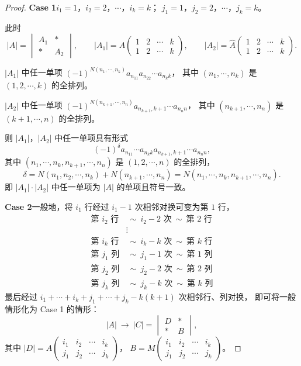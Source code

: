 \begin{proof}
\textbf{Case 1}\quad $i_1=1$，$i_2=2$，$\cdots$，$i_k=k$；\;
$j_1=1$，$j_2=2$，$\cdots$，$j_k=k$。

此时
\[
|A|=\begin{vmatrix}A_1&*\\ *&A_2\end{vmatrix},\qquad
|A_1|=A\begin{pmatrix}1&2&\cdots&k\\1&2&\cdots&k\end{pmatrix},\qquad
|A_2|=\hat{A}\begin{pmatrix}1&2&\cdots&k\\1&2&\cdots&k\end{pmatrix}.
\]

$|A_1|$ 中任一单项
$(-1)^{N(n_1,\cdots,n_k)}a_{n_11}a_{n_22}\cdots a_{n_kk}$，
其中 $(n_1,\cdots,n_k)$ 是 $(1,2,\cdots,k)$ 的全排列。

$|A_2|$ 中任一单项
$(-1)^{N(n_{k+1},\cdots,n_n)}a_{n_{k+1},k+1}\cdots a_{n_nn}$，
其中 $(n_{k+1},\cdots,n_n)$ 是 $(k+1,\cdots,n)$ 的全排列。

则 $|A_1|$，$|A_2|$ 中任一单项具有形式
\[
(-1)^{\delta}a_{n_11}\cdots a_{n_kk}a_{n_{k+1},k+1}\cdots a_{n_nn},
\]
其中 $(n_1,\cdots,n_k,n_{k+1},\cdots,n_n)$ 是 $(1,2,\cdots,n)$ 的全排列，
\[
\delta=N(n_1,n_2,\cdots,n_k)+N(n_{k+1},\cdots,n_n)
=N(n_1,\cdots,n_k,n_{k+1},\cdots,n_n).
\]
即 $|A_1|\cdot|A_2|$ 中任一单项为 $|A|$ 的单项且符号一致。

\textbf{Case 2}\quad 一般地，将 $i_1$ 行经过 $i_1-1$ 次相邻对换可变为第 $1$ 行，
\begin{align*}
\text{第 } i_2 \text{ 行}&\ \sim\ i_2-2 \text{ 次}\ \sim\ \text{第 } 2 \text{ 行}\\
&\vdots\\
\text{第 } i_k \text{ 行}&\ \sim\ i_k-k \text{ 次}\ \sim\ \text{第 } k \text{ 行}\\
\text{第 } j_1 \text{ 列}&\ \sim\ j_1-1 \text{ 次}\ \sim\ \text{第 } 1 \text{ 列}\\
\text{第 } j_2 \text{ 列}&\ \sim\ j_2-2 \text{ 次}\ \sim\ \text{第 } 2 \text{ 列}\\
\text{第 } j_k \text{ 列}&\ \sim\ j_k-k \text{ 次}\ \sim\ \text{第 } k \text{ 列}
\end{align*}
最后经过
$i_1+\cdots+i_k+j_1+\cdots+j_k-k(k+1)$ 次相邻行、列对换，
即可将一般情形化为 Case 1 的情形：
\[
|A|\ \longrightarrow\
|C|=\begin{vmatrix}D&*\\ *&B\end{vmatrix},
\]
其中 $|D|=A\begin{pmatrix}i_1&i_2&\cdots&i_k\\j_1&j_2&\cdots&j_k\end{pmatrix}$，\;
$B=M\begin{pmatrix}i_1&i_2&\cdots&i_k\\j_1&j_2&\cdots&j_k\end{pmatrix}$。


\end{proof}
